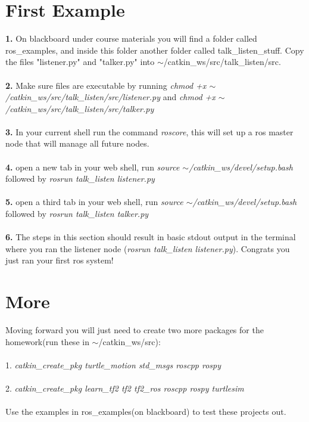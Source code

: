 \documentclass{article}
\begin{document}
\section{First Example}
\textbf{1.} On blackboard under course materials you will find a folder called ros\_examples, and inside this folder another folder called talk\_listen\_stuff. Copy the files "listener.py" and "talker.py" into $\sim$/catkin\_ws/src/talk\_listen/src.\\\\
\textbf{2.} Make sure files are executable by running \emph{chmod +x  $\sim$/catkin\_ws/src/talk\_listen/src/listener.py} and \emph{chmod +x  $\sim$/catkin\_ws/src/talk\_listen/src/talker.py}\\\\
\textbf{3.} In your current shell run the command \emph{roscore}, this will set up a ros master node that will manage all future nodes.\\\\
\textbf{4.} open a new tab in your web shell, run \emph{source $\sim$/catkin\_ws/devel/setup.bash} followed by \emph{rosrun talk\_listen listener.py}\\\\
\textbf{5.} open a third tab in your web shell, run \emph{source $\sim$/catkin\_ws/devel/setup.bash} followed by \emph{rosrun talk\_listen talker.py}\\\\
\textbf{6.} The steps in this section should result in basic stdout output in the terminal where you ran the listener node (\emph{rosrun talk\_listen listener.py}). Congrats you just ran your first ros system!

\section{More}
Moving forward you will just need to create two more packages for the homework(run these in $\sim$/catkin\_ws/src):\\\\
1. \emph{catkin\_create\_pkg turtle\_motion std\_msgs roscpp rospy}\\\\
2. \emph{catkin\_create\_pkg learn\_tf2 tf2 tf2\_ros roscpp rospy turtlesim}\\\\
Use the examples in ros\_examples(on blackboard) to test these projects out.
\end{document}
